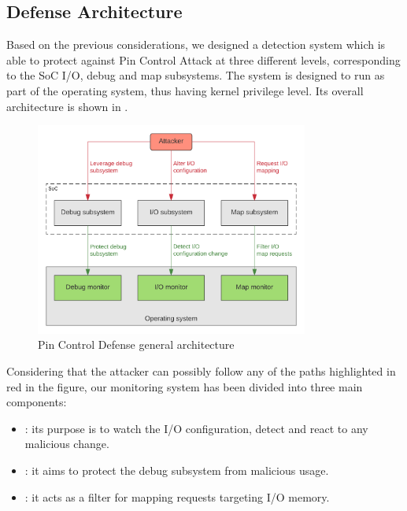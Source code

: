 \subsection{Defense Architecture}
\label{sec:def-arch}

Based on the previous considerations, we designed a detection system which is able to protect against Pin Control Attack at three different levels,
corresponding to the SoC I/O, debug and map subsystems. The system is designed to run as part of the operating system, thus having kernel privilege level.
Its overall architecture is shown in .
\begin{figure}[h]
\centerline{\includegraphics[width=0.8\textwidth]{res/defense}}
\caption{Pin Control Defense general architecture \label{fig:defense}}
\end{figure}
Considering that the attacker can possibly follow any of the paths highlighted in red in the figure,
our monitoring system has been divided into three main components:
\begin{itemize}
	\item {}: its purpose is to watch the I/O configuration, detect and react to any malicious change.
	\item {}: it aims to protect the debug subsystem from malicious usage.
	\item {}: it acts as a filter for mapping requests targeting I/O memory.
\end{itemize}

